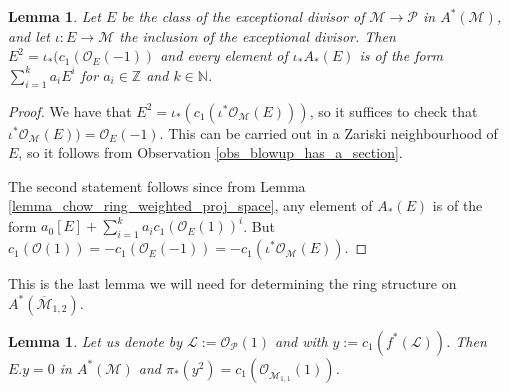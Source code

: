 \documentclass[11pt]{amsart}
\newtheorem{lemma}[theorem]{Lemma}
\theoremstyle{definition}
\theoremstyle{remark}
\newcommand{\calO}{\mathcal O}
\newcommand{\calM}{\mathcal M}
\newcommand{\calL}{\mathcal L}
\newcommand{\calP}{\mathcal P}
\begin{document}
\begin{lemma}\label{lemma_self_intersection_exceptional}
Let $E$ be the class of the exceptional divisor of $\calM\to \calP$ in $A^*(\calM)$, and let $\iota:E\to \calM$ the inclusion of the exceptional divisor. Then $E^2 = \iota_*(c_1(\calO_E(-1)) $ and every element of $\iota_*A_*(E)$ is of the form $\sum_{i=1}^k a_i E^i$ for $a_i \in \mathbb{Z}$ and $k\in \mathbb{N}$.
\end{lemma}
\begin{proof}  
We have that $E^2 = \iota_*(c_1(\iota^*\calO_{\calM}(E)))$, so it suffices to check that $\iota^*\calO_{\calM}(E)) = \calO_E(-1)$. This can be carried out in a Zariski neighbourhood of $E$, so it follows from Observation \ref{obs_blowup_has_a_section}.

The second statement follows since from Lemma \ref{lemma_chow_ring_weighted_proj_space}, any element of $A_*(E)$ is of the form $a_0[E] + \sum_{i=1}^k a_i c_1(\calO_E(1))^i$. But $c_1(\calO(1)) = -c_1(\calO_E(-1)) =-c_1(\iota^*\calO_{\calM}(E)).$
\end{proof}
This is the last lemma we will need for determining the ring structure on $A^*(\overline{\calM}_{1,2})$.
\begin{lemma}\label{lemma_O(1)_restricts_to_0_on_E}
Let us denote by $\calL :=\calO_\calP(1)$ and with $y:= c_1(f^*(\calL))$. Then $E.y = 0$ in $A^*(\calM)$ and $\pi_*(y^2) = c_1(\calO_{\overline{\calM}_{1,1}}(1))$.
\end{lemma}
\end{document}
